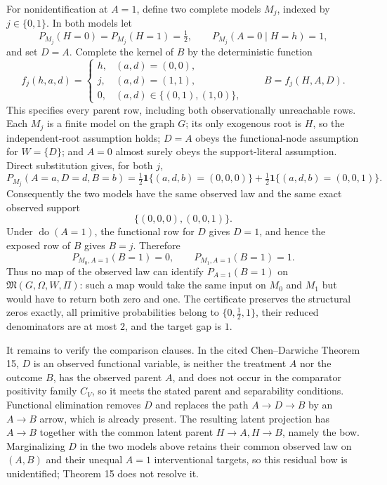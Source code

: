 For nonidentification at \(A=1\), define two complete models \(M_j\), indexed by \(j\in\{0,1\}\).  In both models let
\[
 P_{M_j}(H=0)=P_{M_j}(H=1)=\tfrac12,\qquad
 P_{M_j}(A=0\mid H=h)=1,
\]
and set \(D=A\).  Complete the kernel of \(B\) by the deterministic function
\[
 f_j(h,a,d)=
 \begin{cases}
 h,&(a,d)=(0,0),\\
 j,&(a,d)=(1,1),\\
 0,&(a,d)\in\{(0,1),(1,0)\},
 \end{cases}
 \qquad B=f_j(H,A,D).
\]
This specifies every parent row, including both observationally unreachable rows.  Each \(M_j\) is a finite model on the graph \(G\); its only exogenous root is \(H\), so the independent-root assumption holds; \(D=A\) obeys the functional-node assumption for \(W=\{D\}\); and \(A=0\) almost surely obeys the support-literal assumption.  Direct substitution gives, for both \(j\),
\[
 P_{M_j}(A=a,D=d,B=b)
 =\tfrac12\mathbf 1\{(a,d,b)=(0,0,0)\}
  +\tfrac12\mathbf 1\{(a,d,b)=(0,0,1)\}.
\]
Consequently the two models have the same observed law and the same exact observed support
\[
 \{(0,0,0),(0,0,1)\}.
\]
Under \(\operatorname{do}(A=1)\), the functional row for \(D\) gives \(D=1\), and hence the exposed row of \(B\) gives \(B=j\).  Therefore
\[
 P_{M_0,A=1}(B=1)=0,
 \qquad
 P_{M_1,A=1}(B=1)=1.
\]
Thus no map of the observed law can identify \(P_{A=1}(B=1)\) on \(\mathfrak M(G,\Omega,W,\Pi)\): such a map would take the same input on \(M_0\) and \(M_1\) but would have to return both zero and one.  The certificate preserves the structural zeros exactly, all primitive probabilities belong to \(\{0,\tfrac12,1\}\), their reduced denominators are at most \(2\), and the target gap is \(1\).

It remains to verify the comparison clauses.  In the cited Chen--Darwiche Theorem 15, \(D\) is an observed functional variable, is neither the treatment \(A\) nor the outcome \(B\), has the observed parent \(A\), and does not occur in the comparator positivity family \(C_V\), so it meets the stated parent and separability conditions.  Functional elimination removes \(D\) and replaces the path \(A\to D\to B\) by an \(A\to B\) arrow, which is already present.  The resulting latent projection has \(A\to B\) together with the common latent parent \(H\to A,H\to B\), namely the bow.  Marginalizing \(D\) in the two models above retains their common observed law on \((A,B)\) and their unequal \(A=1\) interventional targets, so this residual bow is unidentified; Theorem 15 does not resolve it.

